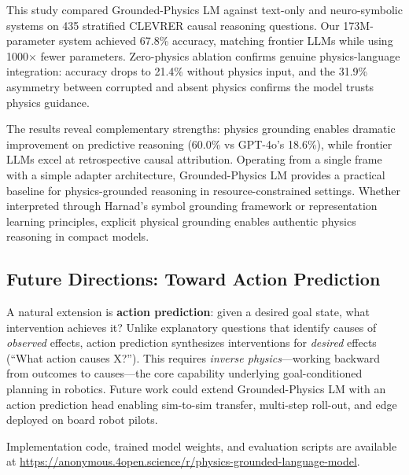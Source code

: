 \documentclass[conference]{IEEEtran}
\theoremstyle{plain}
\theoremstyle{definition}
\theoremstyle{remark}
\begin{document}
This study compared Grounded-Physics LM against text-only and neuro-symbolic systems on 435 stratified CLEVRER causal reasoning questions. Our 173M-parameter system achieved 67.8\% accuracy, matching frontier LLMs while using 1000$\times$ fewer parameters. Zero-physics ablation confirms genuine physics-language integration: accuracy drops to 21.4\% without physics input, and the 31.9\% asymmetry between corrupted and absent physics confirms the model trusts physics guidance.

The results reveal complementary strengths: physics grounding enables dramatic improvement on predictive reasoning (60.0\% vs GPT-4o's 18.6\%), while frontier LLMs excel at retrospective causal attribution. Operating from a single frame with a simple adapter architecture, Grounded-Physics LM provides a practical baseline for physics-grounded reasoning in resource-constrained settings. Whether interpreted through Harnad's symbol grounding framework or representation learning principles, explicit physical grounding enables authentic physics reasoning in compact models.

\subsection{Future Directions: Toward Action Prediction}

A natural extension is \textbf{action prediction}: given a desired goal state, what intervention achieves it? Unlike explanatory questions that identify causes of \emph{observed} effects, action prediction synthesizes interventions for \emph{desired} effects (``What action causes X?''). This requires \emph{inverse physics}---working backward from outcomes to causes---the core capability underlying goal-conditioned planning in robotics. Future work could extend Grounded-Physics LM with an action prediction head enabling sim-to-sim transfer, multi-step roll-out, and edge deployed on board robot pilots.

Implementation code, trained model weights, and evaluation scripts are available at \url{https://anonymous.4open.science/r/physics-grounded-language-model}.




\end{document}

